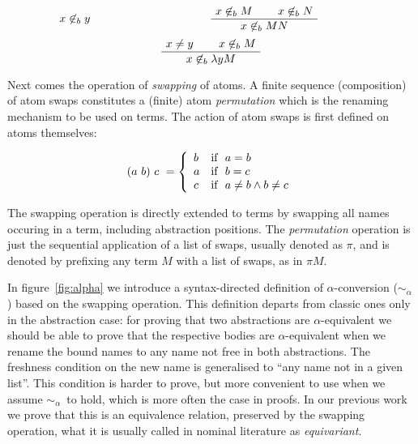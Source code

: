 \documentclass[preprint,10pt]{sigplanconf}
\newcommand{\lam}{\ensuremath{\lambda}}
\newcommand{\alpsym}{\ensuremath{\sim_\alpha}}
\newcommand{\ninb}{\ensuremath{\not\in_b}}
\begin{document}
\[
\begin{minipage}{0.4\linewidth}
   \LeftLabel{\ninb v} \AxiomC{$x \ninb y$} \DisplayProof
\end{minipage}
\begin{minipage}{0.4\linewidth}
  \AxiomC{$x \ninb M$} 
  \AxiomC{$x \ninb N$}
  \BinaryInfC{$x \ninb M N$} \DisplayProof
\end{minipage}
\]
\[
\begin{minipage}{0.75\linewidth}
\center
  \AxiomC{$x \neq y$}
  \AxiomC{$x \ninb M$}
  \BinaryInfC{$x  \ninb  \lambda y M$} \DisplayProof
\end{minipage}
\]

Next comes the operation of \emph{swapping} of atoms. A finite sequence (composition) of atom swaps constitutes a (finite) atom \emph{permutation} which is the renaming mechanism to be used on terms. The action of atom swaps is first defined on atoms themselves:

\[ (a\ b)\ c\ = \left\{
  \begin{array}{ll}
    b & $if$\ \ a = b \\
    a & $if$\ \ b = c \\
    c & $if$\ \ a \neq b \wedge b \neq c \\ 
  \end{array} \right.
\]

The swapping operation is directly extended to terms by swapping all names occuring in a term, including abstraction positions. The \emph{permutation} operation is just the sequential application of a list of swaps, usually denoted as $\pi$, and is denoted by prefixing any term $M$ with a list of swaps, as in $\pi M$.

In figure~\ref{fig:alpha} we introduce a syntax-directed definition of $\alpha$-conversion (\alpsym) based on the swapping operation. 
This definition departs from classic ones only in the abstraction case: 
for proving that two abstractions are $\alpha$-equivalent we should be able to prove that the respective bodies are $\alpha$-equivalent when we rename the bound names to any name not free in both abstractions. 
The freshness condition on the new name is generalised to ``any name not in a given list''.%
This condition is harder to prove, but more convenient to use when we assume \alpsym\ to hold, which is more often the case in proofs. 
In our previous work we prove that this is an equivalence relation, preserved by the swapping operation, what it is usually called in nominal literature as \emph{equivariant}.
\end{document}
